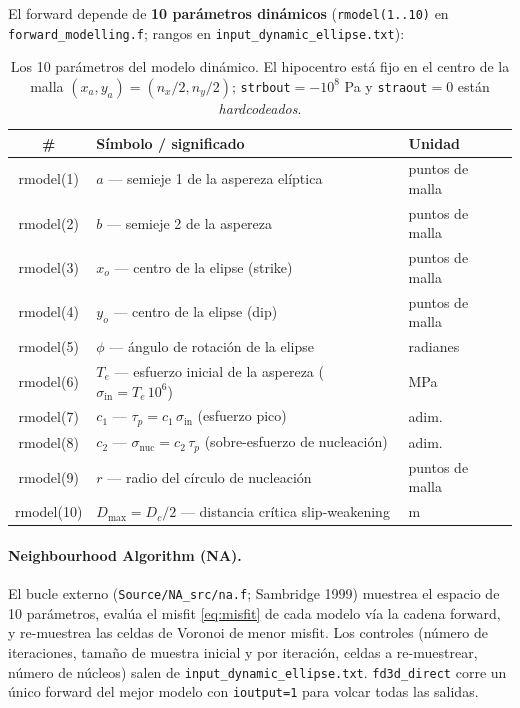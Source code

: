 \documentclass[11pt,a4paper]{article}
\begin{document}
El forward depende de \textbf{10 parámetros dinámicos} (\texttt{rmodel(1..10)} en
\texttt{forward\_modelling.f}; rangos en \texttt{input\_dynamic\_ellipse.txt}):

\begin{table}[h]
\centering
\begin{tabular}{>{\ttfamily}c l l}
\toprule
\normalfont\# & Símbolo / significado & Unidad \\
\midrule
rmodel(1)  & $a$ --- semieje 1 de la aspereza elíptica      & puntos de malla \\
rmodel(2)  & $b$ --- semieje 2 de la aspereza               & puntos de malla \\
rmodel(3)  & $x_o$ --- centro de la elipse (strike)         & puntos de malla \\
rmodel(4)  & $y_o$ --- centro de la elipse (dip)            & puntos de malla \\
rmodel(5)  & $\phi$ --- ángulo de rotación de la elipse     & radianes \\
rmodel(6)  & $T_e$ --- esfuerzo inicial de la aspereza ($\sigma_{\text{in}}=T_e\,10^6$) & MPa \\
rmodel(7)  & $c_1$ --- $\tau_p = c_1\,\sigma_{\text{in}}$ (esfuerzo pico)   & adim. \\
rmodel(8)  & $c_2$ --- $\sigma_{\text{nuc}} = c_2\,\tau_p$ (sobre-esfuerzo de nucleación) & adim. \\
rmodel(9)  & $r$ --- radio del círculo de nucleación        & puntos de malla \\
rmodel(10) & $D_{\max}=D_c/2$ --- distancia crítica slip-weakening & m \\
\bottomrule
\end{tabular}
\caption{Los 10 parámetros del modelo dinámico. El hipocentro está fijo en el
centro de la malla $(x_a,y_a)=(n_x/2,n_y/2)$; \texttt{strbout}$=-10^8$ Pa y
\texttt{straout}$=0$ están \emph{hardcodeados}.}
\end{table}

\paragraph{Neighbourhood Algorithm (NA).} El bucle externo
(\texttt{Source/NA\_src/na.f}; Sambridge 1999) muestrea el espacio de 10
parámetros, evalúa el misfit \eqref{eq:misfit} de cada modelo vía la cadena
forward, y re-muestrea las celdas de Voronoi de menor misfit. Los controles
(número de iteraciones, tamaño de muestra inicial y por iteración, celdas a
re-muestrear, número de núcleos) salen de
\texttt{input\_dynamic\_ellipse.txt}. \texttt{fd3d\_direct} corre un único
forward del mejor modelo con \texttt{ioutput=1} para volcar todas las salidas.
\end{document}
